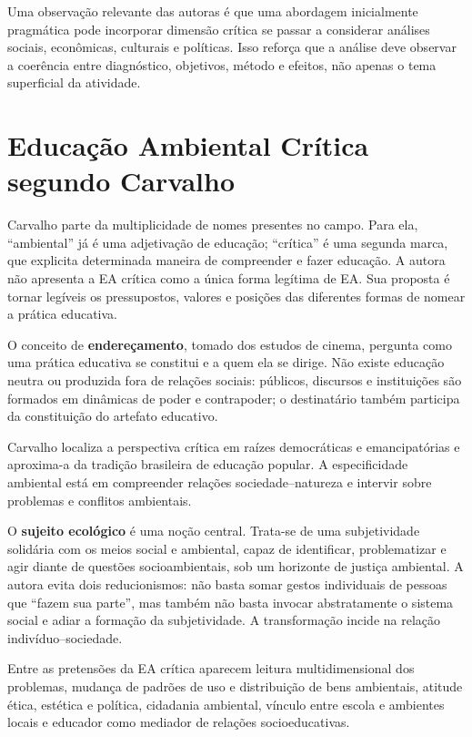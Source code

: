 \documentclass[12pt,a4paper]{article}
\begin{document}
Uma observação relevante das autoras é que uma abordagem inicialmente pragmática pode incorporar dimensão crítica se passar a considerar análises sociais, econômicas, culturais e políticas. Isso reforça que a análise deve observar a coerência entre diagnóstico, objetivos, método e efeitos, não apenas o tema superficial da atividade.

\section{Educação Ambiental Crítica segundo Carvalho}

Carvalho parte da multiplicidade de nomes presentes no campo. Para ela, ``ambiental'' já é uma adjetivação de educação; ``crítica'' é uma segunda marca, que explicita determinada maneira de compreender e fazer educação. A autora não apresenta a EA crítica como a única forma legítima de EA. Sua proposta é tornar legíveis os pressupostos, valores e posições das diferentes formas de nomear a prática educativa.

O conceito de \textbf{endereçamento}, tomado dos estudos de cinema, pergunta como uma prática educativa se constitui e a quem ela se dirige. Não existe educação neutra ou produzida fora de relações sociais: públicos, discursos e instituições são formados em dinâmicas de poder e contrapoder; o destinatário também participa da constituição do artefato educativo.

Carvalho localiza a perspectiva crítica em raízes democráticas e emancipatórias e aproxima-a da tradição brasileira de educação popular. A especificidade ambiental está em compreender relações sociedade--natureza e intervir sobre problemas e conflitos ambientais.

O \textbf{sujeito ecológico} é uma noção central. Trata-se de uma subjetividade solidária com os meios social e ambiental, capaz de identificar, problematizar e agir diante de questões socioambientais, sob um horizonte de justiça ambiental. A autora evita dois reducionismos: não basta somar gestos individuais de pessoas que ``fazem sua parte'', mas também não basta invocar abstratamente o sistema social e adiar a formação da subjetividade. A transformação incide na relação indivíduo--sociedade.

Entre as pretensões da EA crítica aparecem leitura multidimensional dos problemas, mudança de padrões de uso e distribuição de bens ambientais, atitude ética, estética e política, cidadania ambiental, vínculo entre escola e ambientes locais e educador como mediador de relações socioeducativas.
\end{document}
